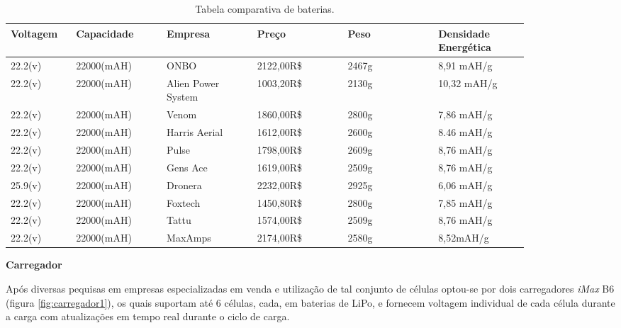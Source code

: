 \begin{table}
    \centering
    \caption{Tabela comparativa de baterias.}
\begin{tabular}{|p{0.10\linewidth}|p{0.15\linewidth}|p{0.15\linewidth}|p{0.15\linewidth}|p{0.15\linewidth}|p{0.15\linewidth}|}
\hline
Voltagem&Capacidade&Empresa&Preço&Peso&Densidade Energética\\ \hline

22.2(v)&22000(mAH)&ONBO&2122,00R\$&2467g&8,91 mAH/g \\ \hline

22.2(v)&22000(mAH)&Alien Power System&1003,20R\$&2130g&10,32 mAH/g \\ \hline

22.2(v)&22000(mAH)&Venom&1860,00R\$&2800g&7,86 mAH/g \\ \hline

22.2(v)&22000(mAH)&Harris Aerial&1612,00R\$&2600g&8.46 mAH/g \\ \hline

22.2(v)&22000(mAH)&Pulse&1798,00R\$&2609g&8,76 mAH/g \\ \hline

22.2(v)&22000(mAH)&Gens Ace&1619,00R\$&2509g&8,76 mAH/g \\ \hline

25.9(v)&22000(mAH)&Dronera&2232,00R\$&2925g&6,06 mAH/g \\ \hline

22.2(v)&22000(mAH)&Foxtech&1450,80R\$&2800g&7,85 mAH/g \\ \hline

22.2(v)&22000(mAH)&Tattu&1574,00R\$&2509g&8,76 mAH/g \\ \hline

22.2(v)&22000(mAH)&MaxAmps&2174,00R\$&2580g&8,52mAH/g \\ \hline
\end{tabular}
    \label{fig:tabelabateria}
\end{table}

\indent \textbf{Carregador}

Após diversas pequisas em empresas especializadas em venda e utilização de tal conjunto de células optou-se por dois 
carregadores \textit{iMax} B6 (figura \ref{fig:carregador1}), os quais suportam até 6 células, cada, em baterias de LiPo, e 
fornecem voltagem individual de cada célula durante a carga com atualizações em tempo real durante o ciclo de carga.

